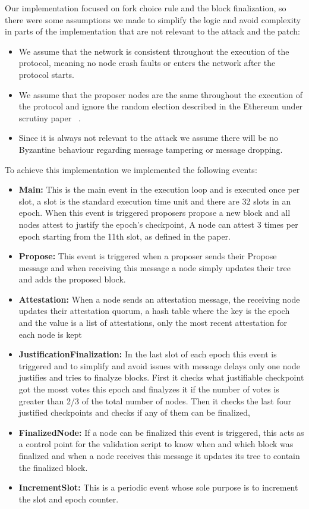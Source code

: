 Our implementation focused on fork choice rule and the block finalization, so there were some assumptions we made
to simplify the logic and avoid complexity in parts of the implementation that are not relevant to the attack and the patch:
\begin{itemize}
    \item We assume that the network is consistent throughout the execution of the protocol, meaning no node crash faults
or enters the network after the protocol starts.
    \item We assume that the proposer nodes are the same throughout the execution of the protocol and ignore the random election
described in the Ethereum under scrutiny paper ~\cite{ethereum_under_scrutiny}.
    \item Since it is always not relevant to the attack we assume there will be no Byzantine behaviour regarding message
tampering or message dropping.
\end{itemize}

To achieve this implementation we implemented the following events:

\begin{itemize}
    \item \textbf{Main:} This is the main event in the execution loop and is executed once per slot, a slot is the standard execution time unit and
    there are 32 slots in an epoch. When this event is triggered proposers propose a new block and all nodes attest to justify the epoch's checkpoint,
    A node can attest 3 times per epoch starting from the 11th slot, as defined in the paper.
    \item \textbf{Propose:} This event is triggered when a proposer sends their Propose message and when receiving this message a node simply updates their tree
    and adds the proposed block.
    \item \textbf{Attestation:} When a node sends an attestation message, the receiving node updates their attestation quorum, a hash table where the key is
    the epoch and the value is a list of attestations, only the most recent attestation for each node is kept
    \item \textbf{JustificationFinalization:} In the last slot of each epoch this event is triggered and to simplify and avoid issues with message delays only
    one node justifies and tries to finalyze blocks. First it checks what justifiable checkpoint got the mosst votes this epoch and finalyzes it if the number
    of votes is greater than 2/3 of the total number of nodes. Then it checks the last four justified checkpoints and checks if any of them can be finalized,
    \item \textbf{FinalizedNode:} If a node can be finalized this event is triggered, this acts as a control point for the validation script to know when and which block
    was finalized and when a node receives this message it updates its tree to contain the finalized block.
    \item \textbf{IncrementSlot:} This is a periodic event whose sole purpose is to increment the slot and epoch counter.
\end{itemize}

